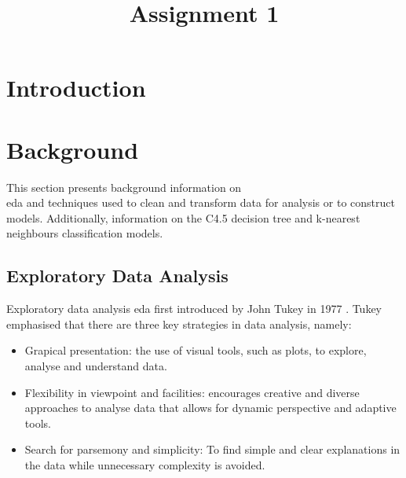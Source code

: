 \documentclass[10pt, conference]{IEEEtran}
\begin{document}
\title{Assignment 1\\
}

\author{
}

\maketitle

\begin{abstract}
    
\end{abstract}

\section{Introduction}



\section{Background}

This section presents background information on \\ \acrlong{eda} and techniques used to clean and transform data
for analysis or to construct models. Additionally, information on the C4.5 decision tree and k-nearest neighbours
classification models.

\subsection{Exploratory Data Analysis}\label{EDA}

Exploratory data analysis \acrshort{eda} first introduced by John Tukey in 1977 \cite{EDA_ref}. Tukey
emphasised that there are three key strategies in data analysis, namely:
\begin{itemize}
    \item Grapical presentation: the use of visual tools, such as plots, to explore, analyse and understand data.
    \item Flexibility in viewpoint and facilities: encourages creative and diverse approaches to analyse data
          that allows for dynamic perspective and adaptive tools.
    \item Search for parsemony and simplicity: To find simple and clear explanations in the data while
          unnecessary complexity is avoided.
\end{itemize}
\end{document}

